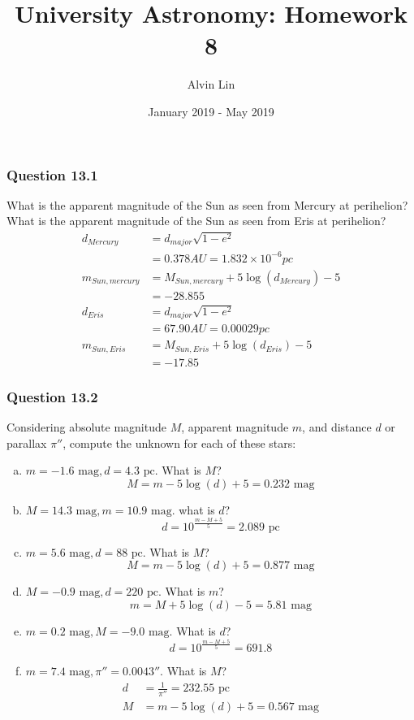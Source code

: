 \documentclass{math}
\title{University Astronomy: Homework 8}
\author{Alvin Lin}
\date{January 2019 - May 2019}
\begin{document}
\maketitle

\subsubsection*{Question 13.1}
What is the apparent magnitude of the Sun as seen from Mercury at perihelion?
What is the apparent magnitude of the Sun as seen from Eris at perihelion?
\begin{align*}
  d_{Mercury} &= d_{major}\sqrt{1-e^2} \\
  &= 0.378AU = 1.832\times10^{-6}pc \\
  m_{Sun,mercury} &= M_{Sun,mercury}+5\log(d_{Mercury})-5 \\
  &= -28.855 \\
  d_{Eris} &= d_{major}\sqrt{1-e^2} \\
  &= 67.90AU = 0.00029pc \\
  m_{Sun,Eris} &= M_{Sun,Eris}+5\log(d_{Eris})-5 \\
  &= -17.85
\end{align*}

\subsubsection*{Question 13.2}
Considering absolute magnitude \( M \), apparent magnitude \( m \), and distance
\( d \) or parallax \( \pi'' \), compute the unknown for each of these stars:
\begin{enumerate}[(a)]
  \item \( m = -1.6\text{ mag}, d = 4.3\text{ pc} \). What is \( M \)?
  \[ M = m-5\log(d)+5 = 0.232\text{ mag} \]
  \item \( M = 14.3\text{ mag}, m = 10.9\text{ mag} \). what is \( d \)?
  \[ d = 10^{\frac{m-M+5}{5}} = 2.089\text{ pc} \]
  \item \( m = 5.6\text{ mag}, d = 88\text{ pc} \). What is \( M \)?
  \[ M = m-5\log(d)+5 = 0.877\text{ mag} \]
  \item \( M = -0.9\text{ mag}, d = 220\text{ pc} \). What is \( m \)?
  \[ m = M+5\log(d)-5 = 5.81\text{ mag} \]
  \item \( m = 0.2\text{ mag}, M = -9.0\text{ mag} \). What is \( d \)?
  \[ d = 10^{\frac{m-M+5}{5}} = 691.8 \]
  \item \( m = 7.4\text{ mag}, \pi'' = 0.0043'' \). What is \( M \)?
  \begin{align*}
    d &= \frac{1}{\pi''} = 232.55\text{ pc} \\
    M &= m-5\log(d)+5 = 0.567\text{ mag}
  \end{align*}
\end{enumerate}
\end{document}
